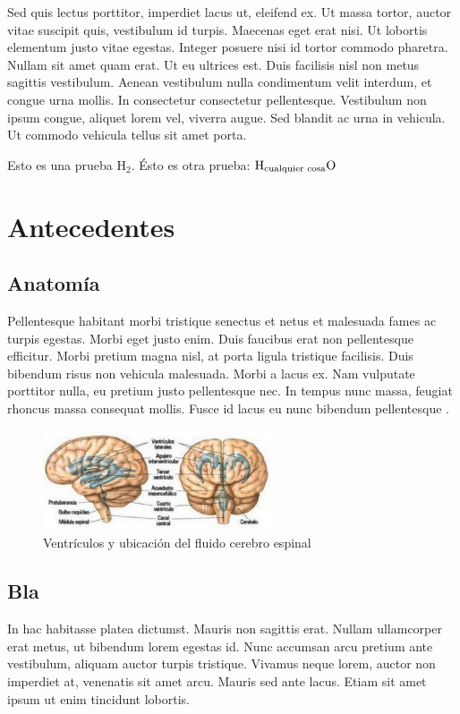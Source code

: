\documentclass[fisica]{fcfmtesis}
\begin{document}
Sed quis lectus porttitor, imperdiet lacus ut, eleifend ex. Ut massa tortor,
auctor vitae suscipit quis, vestibulum id turpis. Maecenas eget erat nisi. Ut
lobortis elementum justo vitae egestas. Integer posuere nisi id tortor commodo
pharetra. Nullam sit amet quam erat. Ut eu ultrices est. Duis facilisis nisl non
metus sagittis vestibulum. Aenean vestibulum nulla condimentum velit interdum,
et congue urna mollis. In consectetur consectetur pellentesque. Vestibulum non
ipsum congue, aliquet lorem vel, viverra augue. Sed blandit ac urna in vehicula.
Ut commodo vehicula tellus sit amet porta.

Esto es una prueba H$_2$. Ésto es otra prueba:
$\mathrm{H}_{\mbox{\scriptsize cualquier cosa}}\mathrm{O}$

\mainmatter
\chapter{Antecedentes}
\section{Anatomía}
Pellentesque habitant morbi tristique senectus et netus et malesuada fames ac
turpis egestas. Morbi eget justo enim. Duis faucibus erat non pellentesque
efficitur. Morbi pretium magna nisl, at porta ligula tristique facilisis. Duis
bibendum risus non vehicula malesuada. Morbi a lacus ex. Nam vulputate porttitor
nulla, eu pretium justo pellentesque nec. In tempus nunc massa, feugiat rhoncus
massa consequat mollis. Fusce id lacus eu nunc bibendum pellentesque \cite{E-Marieb}.

\begin{figure}[!ht]
	\begin{center}
	\includegraphics[width=0.6\textwidth]{ventri.png}
	\caption[Ventrículos y ubicación del fluido cerebro espinal]%
	{Ventrículos y ubicación del fluido cerebro espinal \cite{H}}
	\end{center}
\end{figure}

\section{Bla}
In hac habitasse platea dictumst. Mauris non sagittis erat. Nullam ullamcorper
erat metus, ut bibendum lorem egestas id. Nunc accumsan arcu pretium ante
vestibulum, aliquam auctor turpis tristique. Vivamus neque lorem, auctor non
imperdiet at, venenatis sit amet arcu. Mauris sed ante lacus. Etiam sit amet
ipsum ut enim tincidunt lobortis.
\end{document}
